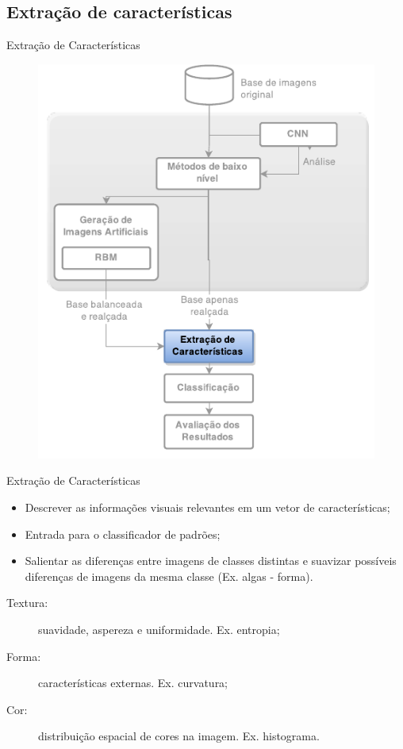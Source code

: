 \documentclass{beamer}
\begin{document}
\subsection{Extração de características}
\begin{frame}{Extração de Características}
\begin{figure}
    \includegraphics[height=0.75\textheight]{figuras/geral_extracao.pdf}
\end{figure}
\end{frame}
\begin{frame}{Extração de Características}
\setlength\leftmargini{0em}
\justifying
\begin{itemize}
\item Descrever as informações visuais relevantes em um vetor de características;
\item Entrada para o classificador de padrões;
\item Salientar as diferenças entre imagens de classes distintas e suavizar possíveis diferenças de imagens da mesma classe (Ex. algas - forma).
\end{itemize}
\setlength\leftmargini{0em}
\begin{description}
\item [Textura:] suavidade, aspereza e uniformidade. Ex. entropia;
\item [Forma:] características externas. Ex. curvatura;
\item [Cor:] distribuição espacial de cores na imagem. Ex. histograma.
\end{description}
\end{frame}
\end{document}
